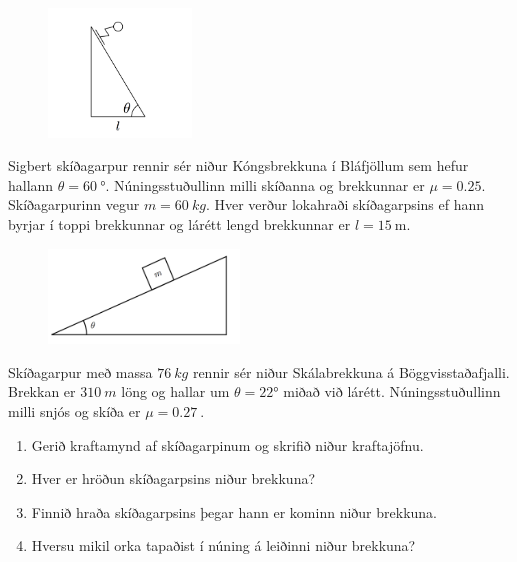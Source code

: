 \begin{enumerate}[label = \textbf{Dæmi \thechapter.\arabic*.}]
\begin{minipage}{\linewidth}
\begin{figure}
\vspace{-2cm}
\includegraphics[width=1.5in]{images/skidi.png}
\end{figure}

\vspace{-0.5cm}

\item Sigbert skíðagarpur rennir sér niður Kóngsbrekkuna í Bláfjöllum sem hefur hallann $\theta = \SI{60}{\degree}$. Núningsstuðullinn milli skíðanna og brekkunnar er $\mu = 0.25$. Skíðagarpurinn vegur $m = \SI{60}{kg}$. Hver verður lokahraði skíðagarpsins ef hann byrjar í toppi brekkunnar og lárétt lengd brekkunnar er $l = \SI{15}{\metre}$.
\end{minipage}

\vspace{0.3cm}

\begin{minipage}{\linewidth}
\begin{figure}
\includegraphics[width=2in]{images/skabjol.png}
\end{figure}

\item Skíðagarpur með massa $\SI{76}{kg}$ rennir sér niður Skálabrekkuna á Böggvisstaðafjalli. Brekkan er $\SI{310}{m}$ löng og hallar um  $\theta = \ang{22}$ miðað við lárétt. Núningsstuðullinn milli snjós og skíða er $\mu = \SI{0.27}{}$. 
\end{minipage}
\vspace{0.1cm}
\begin{enumerate}[label = \textbf{(\alph*)}]
    \item Gerið kraftamynd af skíðagarpinum og skrifið niður kraftajöfnu.
    \item Hver er hröðun skíðagarpsins niður brekkuna?
    \item Finnið hraða skíðagarpsins þegar hann er kominn niður brekkuna.
    \item Hversu mikil orka tapaðist í núning á leiðinni niður brekkuna?
\end{enumerate}


\end{enumerate}
